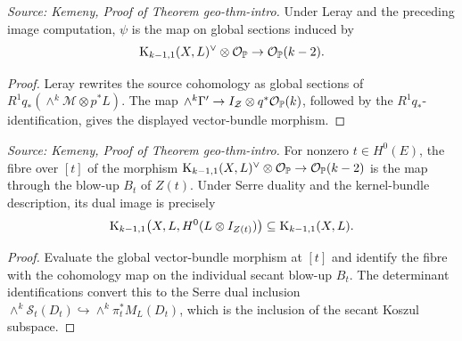 \begin{lemma}
  \label{lem:kemeny_psi_global_sections}
  \textit{Source: Kemeny, Proof of Theorem geo-thm-intro.}
  Under Leray and the preceding image computation, \(\psi\) is the map on global
  sections induced by
  \[
    \mathrm{K}_{k-1,1}(X,L)^\vee\otimes\mathcal{O}_{\mathbb{P}}\to\mathcal{O}_{\mathbb{P}}(k-2).
  \]
\end{lemma}
\begin{proof}
  Leray rewrites the source cohomology as global sections of
  \(R^1q_*(\wedge^k\mathcal M\otimes p^*L)\).  The map
  \(\wedge^k\Gamma'\to I_{\mathcal{Z}}\otimes q^*\mathcal{O}_{\mathbb{P}}(k)\), followed by the
  \(R^1q_*\)-identification, gives the displayed vector-bundle morphism.
\end{proof}

\begin{lemma}
  \label{lem:kemeny_fibre_secant_map}
  \textit{Source: Kemeny, Proof of Theorem geo-thm-intro.}
  For nonzero \(t\in H^0(E)\), the fibre over \([t]\) of the morphism
  \(\mathrm{K}_{k-1,1}(X,L)^\vee\otimes\mathcal{O}_{\mathbb{P}}\to\mathcal{O}_{\mathbb{P}}(k-2)\) is the map through
  the blow-up \(B_t\) of \(Z(t)\).  Under Serre duality and the kernel-bundle
  description, its dual image is precisely
  \[
    \mathrm{K}_{k-1,1}\bigl(X,L,H^0(L\otimes I_{Z(t)})\bigr)
    \subseteq \mathrm{K}_{k-1,1}(X,L).
  \]
\end{lemma}
\begin{proof}
  Evaluate the global vector-bundle morphism at \([t]\) and identify the fibre
  with the cohomology map on the individual secant blow-up \(B_t\).  The
  determinant identifications convert this to the Serre dual inclusion
  \(\wedge^k\mathcal S_t(D_t)\hookrightarrow\wedge^k\pi_t^*M_L(D_t)\), which is
  the inclusion of the secant Koszul subspace.
\end{proof}

